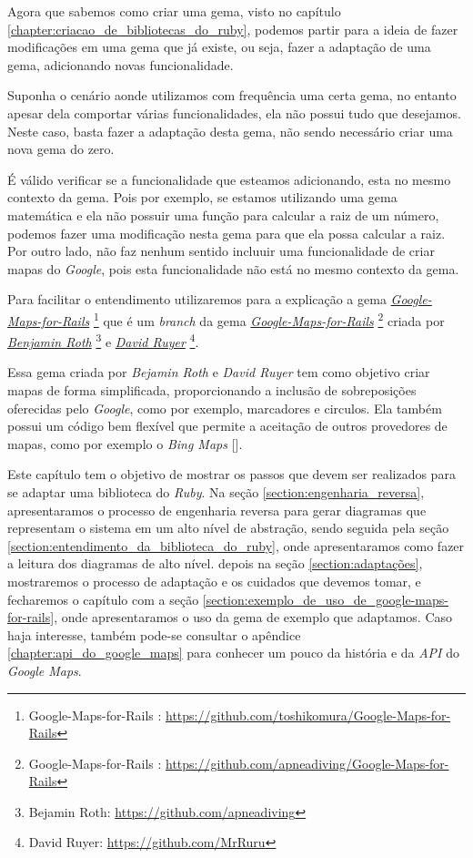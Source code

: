 Agora que sabemos como criar uma gema, visto no capítulo \ref{chapter:criacao_de_bibliotecas_do_ruby},
podemos partir para a ideia de fazer modificações em uma gema que já existe, ou seja, fazer a
adaptação de uma gema, adicionando novas funcionalidade.

Suponha o cenário aonde utilizamos com frequência uma certa gema, no entanto apesar dela comportar várias 
funcionalidades, ela não possui tudo que desejamos. Neste caso, basta fazer a adaptação desta gema, não 
sendo necessário criar uma nova gema do zero.

É válido verificar se a funcionalidade que esteamos adicionando, esta no mesmo contexto da gema.
Pois por exemplo, se estamos utilizando uma gema matemática e ela não possuir uma função para calcular a 
raiz de um número, podemos fazer uma modificação nesta gema para que ela possa calcular a raiz. 
Por outro lado, não faz nenhum sentido incluuir uma funcionalidade de criar mapas do \emph{Google}, pois 
esta funcionalidade não está no mesmo contexto da gema.

Para facilitar o entendimento utilizaremos para a explicação a gema 
\emph{\href{https://github.com/toshikomura/Google-Maps-for-Rails}{Google-Maps-for-Rails}} 
\footnote{Google-Maps-for-Rails : \url{https://github.com/toshikomura/Google-Maps-for-Rails}} que é um 
\emph{branch} da gema 
\emph{\href{https://github.com/apneadiving/Google-Maps-for-Rails}{Google-Maps-for-Rails}} 
\footnote{Google-Maps-for-Rails : \url{https://github.com/apneadiving/Google-Maps-for-Rails}} criada por 
\emph{\href{https://github.com/apneadiving}{Benjamin Roth}} 
\footnote{Bejamin Roth: \url{https://github.com/apneadiving}} e 
\emph{\href{https://github.com/MrRuru}{David Ruyer}} \footnote{David Ruyer: \url{https://github.com/MrRuru}}.

Essa gema criada por \emph{Bejamin Roth} e \emph{David Ruyer} tem como objetivo criar mapas de forma 
simplificada, proporcionando a inclusão de sobreposições oferecidas pelo \emph{Google}, como por exemplo,
marcadores e circulos. Ela também possui um código bem flexível que permite a aceitação de outros 
provedores de mapas, como por exemplo o \emph{Bing Maps} [].

Este capítulo tem o objetivo de mostrar os passos que devem ser realizados para se adaptar uma biblioteca
do \emph{Ruby}. Na seção \ref{section:engenharia_reversa}, apresentaramos o processo de engenharia
reversa para gerar diagramas que representam o sistema em um alto nível de abstração, sendo seguida pela
seção \ref{section:entendimento_da_biblioteca_do_ruby}, onde apresentaramos como fazer a leitura dos diagramas de alto
nível. depois na seção \ref{section:adaptações}, mostraremos o processo de adaptação e os cuidados que devemos
tomar, e fecharemos o capítulo com a seção \ref{section:exemplo_de_uso_de_google-maps-for-rails}, onde
apresentaramos o uso da gema de exemplo que adaptamos. Caso haja interesse, também pode-se consultar o
apêndice \ref{chapter:api_do_google_maps} para conhecer um pouco da história e da \emph{API} do
\emph{Google Maps}.

